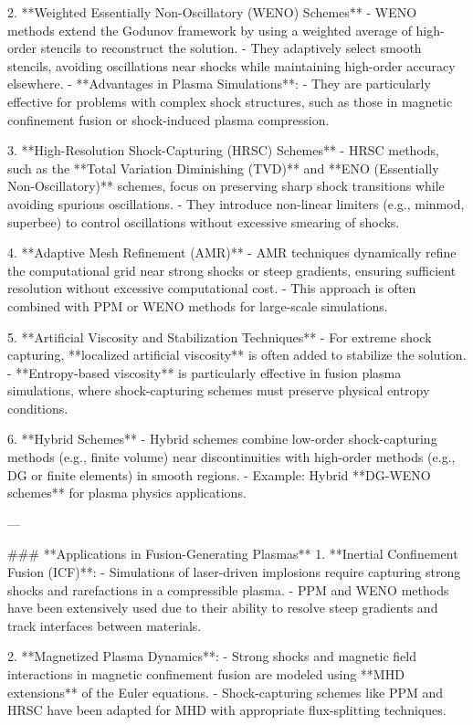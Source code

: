 2. **Weighted Essentially Non-Oscillatory (WENO) Schemes**
   - WENO methods extend the Godunov framework by using a weighted average of high-order stencils to reconstruct the solution.
   - They adaptively select smooth stencils, avoiding oscillations near shocks while maintaining high-order accuracy elsewhere.
   - **Advantages in Plasma Simulations**:
     - They are particularly effective for problems with complex shock structures, such as those in magnetic confinement fusion or shock-induced plasma compression.

3. **High-Resolution Shock-Capturing (HRSC) Schemes**
   - HRSC methods, such as the **Total Variation Diminishing (TVD)** and **ENO (Essentially Non-Oscillatory)** schemes, focus on preserving sharp shock transitions while avoiding spurious oscillations.
   - They introduce non-linear limiters (e.g., minmod, superbee) to control oscillations without excessive smearing of shocks.

4. **Adaptive Mesh Refinement (AMR)**
   - AMR techniques dynamically refine the computational grid near strong shocks or steep gradients, ensuring sufficient resolution without excessive computational cost.
   - This approach is often combined with PPM or WENO methods for large-scale simulations.

5. **Artificial Viscosity and Stabilization Techniques**
   - For extreme shock capturing, **localized artificial viscosity** is often added to stabilize the solution. 
   - **Entropy-based viscosity** is particularly effective in fusion plasma simulations, where shock-capturing schemes must preserve physical entropy conditions.

6. **Hybrid Schemes**
   - Hybrid schemes combine low-order shock-capturing methods (e.g., finite volume) near discontinuities with high-order methods (e.g., DG or finite elements) in smooth regions.
   - Example: Hybrid **DG-WENO schemes** for plasma physics applications.

---

### **Applications in Fusion-Generating Plasmas**
1. **Inertial Confinement Fusion (ICF)**:
   - Simulations of laser-driven implosions require capturing strong shocks and rarefactions in a compressible plasma.
   - PPM and WENO methods have been extensively used due to their ability to resolve steep gradients and track interfaces between materials.

2. **Magnetized Plasma Dynamics**:
   - Strong shocks and magnetic field interactions in magnetic confinement fusion are modeled using **MHD extensions** of the Euler equations.
   - Shock-capturing schemes like PPM and HRSC have been adapted for MHD with appropriate flux-splitting techniques.


